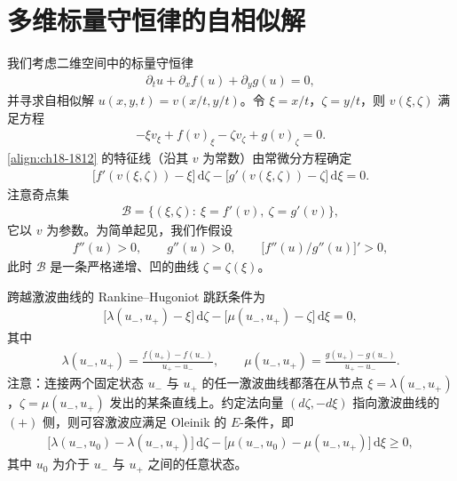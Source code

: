 \documentclass[../../main.tex]{subfiles}
\begin{document}
\section{多维标量守恒律的自相似解}\label{section:ch18-多维标量自相似}

我们考虑二维空间中的标量守恒律
\begin{align}
\partial_t u+\partial_x f(u)+\partial_y g(u)=0,
\label{align:ch18-1811}
\end{align}
并寻求自相似解 $u(x,y,t)=v(x/t,y/t)$。令 $\xi=x/t$，$\zeta=y/t$，则 $v(\xi,\zeta)$ 满足方程
\begin{align}
-\xi v_\xi+f(v)_\xi-\zeta v_\zeta+g(v)_\zeta=0.
\label{align:ch18-1812}
\end{align}
\eqref{align:ch18-1812} 的特征线（沿其 $v$ 为常数）由常微分方程确定
\begin{align}
\bigl[f'(v(\xi,\zeta))-\xi\bigr]\,\mathrm{d}\zeta-\bigl[g'(v(\xi,\zeta))-\zeta\bigr]\,\mathrm{d}\xi=0.
\label{align:ch18-1813}
\end{align}
注意奇点集
\begin{align}
\mathscr{B}=\{(\xi,\zeta):\ \xi=f'(v),\ \zeta=g'(v)\},
\label{align:ch18-1814}
\end{align}
它以 $v$ 为参数。为简单起见，我们作假设
\begin{align}
f''(u)>0,\qquad g''(u)>0,\qquad \bigl[f''(u)/g''(u)\bigr]'>0,
\label{align:ch18-1815}
\end{align}
此时 $\mathscr{B}$ 是一条严格递增、凹的曲线 $\zeta=\zeta(\xi)$。

跨越激波曲线的 Rankine--Hugoniot 跳跃条件为
\begin{align}
\bigl[\lambda(u_-,u_+)-\xi\bigr]\,\mathrm{d}\zeta-\bigl[\mu(u_-,u_+)-\zeta\bigr]\,\mathrm{d}\xi=0,
\label{align:ch18-1816}
\end{align}
其中
\begin{align}
\lambda(u_-,u_+)=\frac{f(u_+)-f(u_-)}{u_+-u_-},\qquad
\mu(u_-,u_+)=\frac{g(u_+)-g(u_-)}{u_+-u_-}.
\label{align:ch18-1817}
\end{align}
注意：连接两个固定状态 $u_-$ 与 $u_+$ 的任一激波曲线都落在从节点 $\xi=\lambda(u_-,u_+)$，$\zeta=\mu(u_-,u_+)$ 发出的某条直线上。约定法向量 $(d\zeta,-d\xi)$ 指向激波曲线的 $(+)$ 侧，则可容激波应满足 Oleinik 的 $E$-条件，即
\begin{align}
\bigl[\lambda(u_-,u_0)-\lambda(u_-,u_+)\bigr]\,\mathrm{d}\zeta-\bigl[\mu(u_-,u_0)-\mu(u_-,u_+)\bigr]\,\mathrm{d}\xi\geqslant 0,
\label{align:ch18-1818}
\end{align}
其中 $u_0$ 为介于 $u_-$ 与 $u_+$ 之间的任意状态。
\end{document}
